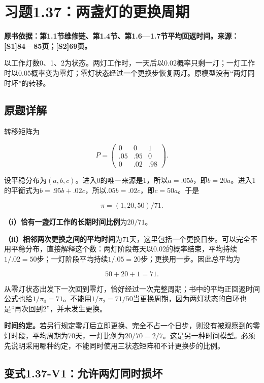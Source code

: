 \documentclass[
  11pt,
  a4paper,
  UTF8,
  fontset=fandol]{ctexart}
\begin{document}
\section{习题1.37：两盏灯的更换周期}\label{ux4e60ux98981.37ux4e24ux76cfux706fux7684ux66f4ux6362ux5468ux671f}

\textbf{原书依据：第1.1节维修链、第1.4节、第1.6---1.7节平均回返时间。来源：{[}S1{]}84---85页；{[}S2{]}69页。}

以工作灯数0、1、2为状态。两灯工作时，一天后以0.02概率只剩一灯；一灯工作时以0.05概率变为零灯；零灯状态经过一个更换步恢复两灯。原模型没有``两灯同时坏''的转移。

\subsection{原题详解}\label{ux539fux9898ux8be6ux89e3-7}

转移矩阵为

\[
P=\begin{pmatrix}0&0&1\\.05&.95&0\\0&.02&.98\end{pmatrix}.
\]

设平稳分布为\((a,b,c)\)。进入0的唯一来源是1，所以\(a=.05b\)，即\(b=20a\)。进入1的平衡式为\(b=.95b+.02c\)，所以\(.05b=.02c\)，即\(c=50a\)。于是

\[
\boxed{\pi=(1,20,50)/71.}
\]

\textbf{（i）恰有一盏灯工作的长期时间比例}为\(\boxed{20/71}\)。

\textbf{（ii）相邻两次更换之间的平均时间}为\(\boxed{71\text{天}}\)，这里包括一个更换日步。可以完全不用平稳分布，直接解释这个数：两灯阶段每天以0.02的概率结束，平均持续\(1/.02=50\)步；一灯阶段平均持续\(1/.05=20\)步；更换用一步。因此总平均为

\[
50+20+1=71.
\]

从零灯状态出发下一次回到零灯，恰好经过一次完整周期；书中的平均正回返时间公式也给\(1/\pi_0=71\)。不能用\(1/\pi_2=71/50\)当更换周期，因为两灯状态的自环也是``再次回到2''，并未发生更换。

\textbf{时间约定。}若另行规定零灯后立即更换、完全不占一个日步，则没有被观察到的零灯时段，平均周期为70天，一灯比例为\(20/70=2/7\)。这是另一种时间模型。必须先说明采用哪种约定，不能同时使用三状态矩阵和不计更换步的比例。

\subsection{变式1.37-V1：允许两灯同时损坏}\label{ux53d8ux5f0f1.37-v1ux5141ux8bb8ux4e24ux706fux540cux65f6ux635fux574f}
\end{document}
